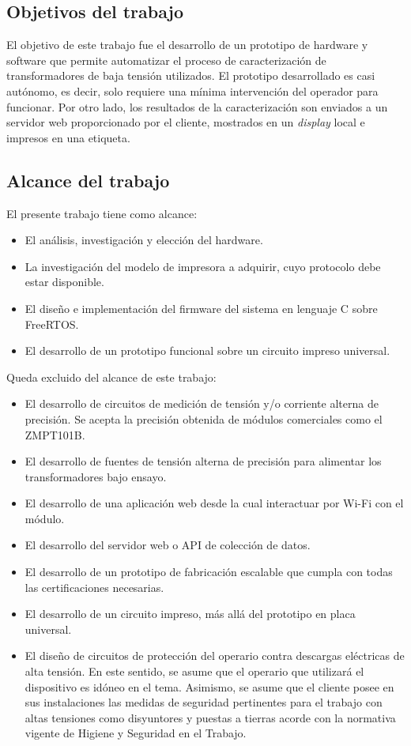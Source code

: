 \subsection{Objetivos del trabajo}

El objetivo de este trabajo fue el desarrollo de un prototipo de hardware y software que permite automatizar el proceso de caracterización de transformadores de baja tensión utilizados. El prototipo desarrollado es casi autónomo, es decir, solo requiere una mínima intervención del operador para funcionar. Por otro lado, los resultados de la caracterización son enviados a un servidor web proporcionado por el cliente, mostrados en un \textit{display} local e impresos en una etiqueta.

\subsection{Alcance del trabajo}
El presente trabajo tiene como alcance:
\begin{itemize}
\item El análisis, investigación y elección del hardware.
\item La investigación del modelo de impresora a adquirir, cuyo protocolo debe estar disponible.
\item El diseño e implementación del firmware del sistema en lenguaje C sobre FreeRTOS.
\item El desarrollo de un prototipo funcional sobre un circuito impreso universal.
\end{itemize}

Queda excluido del alcance de este trabajo:
\begin{itemize}
\item El desarrollo de circuitos de medición de tensión y/o corriente alterna de precisión. Se acepta la precisión obtenida de módulos comerciales como el ZMPT101B.
\item El desarrollo de fuentes de tensión alterna de precisión para alimentar los transformadores bajo ensayo.
\item El desarrollo de una aplicación web desde la cual interactuar por Wi-Fi con el módulo.
\item El desarrollo del servidor web o API de colección de datos.
\item El desarrollo de un prototipo de fabricación escalable que cumpla con todas las certificaciones necesarias.
\item El desarrollo de un circuito impreso, más allá del prototipo en placa universal.
\item El diseño de circuitos de protección del operario contra descargas eléctricas de alta tensión. En este sentido, se asume que el operario que utilizará el dispositivo es idóneo en el tema. Asimismo, se asume que el cliente posee en sus instalaciones las medidas de seguridad pertinentes para el trabajo con altas tensiones como disyuntores y puestas a tierras acorde con la normativa vigente de Higiene y Seguridad en el Trabajo.
\end{itemize}

